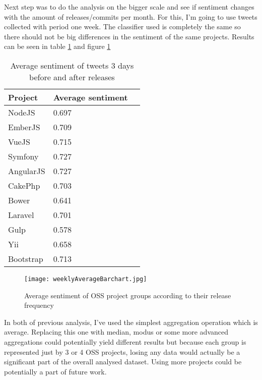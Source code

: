 
Next step was to do the analysis on the bigger scale and see if sentiment changes with the amount of releases/commits per month. For this, I'm going to use tweets collected with period one week. The classifier used is completely the same so there should not be big differences in the sentiment of the same projects. Results can be seen in table \ref{table:weeklyAverageTable} and figure \ref{fig:weeklyAverageBarchart}

\begin{table}[H]
\centering
\begin{tabular}{ |p{3cm}|p{3cm}|p{3cm}|}
 \hline
\textbf{Project }& \textbf{Average sentiment}\\
 \hline
 NodeJS   & 0.697 \\ \hline
 EmberJS   & 0.709\\ \hline
 VueJS   & 0.715 \\ \hline 
 Symfony & 0.727 \\ \hline   
 AngularJS   & 0.727 \\ \hline
 CakePhp & 0.703 \\ \hline 
 Bower   & 0.641 \\ \hline 
 Laravel & 0.701 \\ \hline
 Gulp & 0.578 \\ \hline
 Yii & 0.658 \\ \hline
 Bootstrap & 0.713 \\ \hline
\end{tabular}
\caption{Average sentiment of tweets 3 days before and after releases}
\label{table:weeklyAverageTable}
\end{table}


\begin{figure}[H]%
    \centering
	\texttt{[image: weeklyAverageBarchart.jpg]}
    \caption{Average sentiment of OSS project groups according to their release frequency}%
    \label{fig:weeklyAverageBarchart}%
\end{figure}

In both of previous analysis, I've used the simplest aggregation operation which is average. Replacing this one with median, modus or some more advanced aggregations could potentially yield different results but because each group is represented just by 3 or 4 OSS projects, losing any data would actually be a significant part of the overall analysed dataset. Using more projects could be potentially a part of future work.